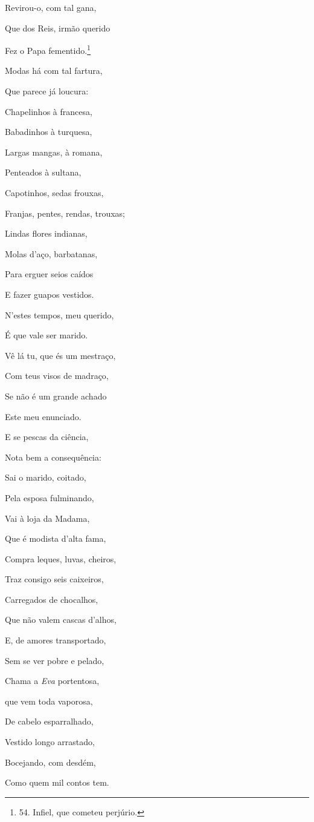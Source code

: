 Revirou-o, com tal gana,

Que dos Reis, irmão querido

Fez o Papa fementido.\footnote{54. Infiel, que cometeu perjúrio.}

Modas há com tal fartura,

Que parece já loucura:

Chapelinhos à francesa,

Babadinhos à turquesa,

Largas mangas, à romana,

Penteados à sultana,

Capotinhos, sedas frouxas,

Franjas, pentes, rendas, trouxas;

Lindas flores indianas,

Molas d'aço, barbatanas,

Para erguer seios caídos

E fazer guapos vestidos.

N'estes tempos, meu querido,

É que vale ser marido.

Vê lá tu, que és um mestraço,

Com teus visos de madraço,

Se não é um grande achado

Este meu enunciado.

E se pescas da ciência,

Nota bem a consequência:

Sai o marido, coitado,

Pela esposa fulminando,

Vai à loja da Madama,

Que é modista d'alta fama,

Compra leques, luvas, cheiros,

Traz consigo seis caixeiros,

Carregados de chocalhos,

Que não valem cascas d'alhos,

E, de amores transportado,

Sem se ver pobre e pelado,

Chama a \emph{Eva} portentosa,

que vem toda vaporosa,

De cabelo esparralhado,

Vestido longo arrastado,

Bocejando, com desdém,

Como quem mil contos tem.

